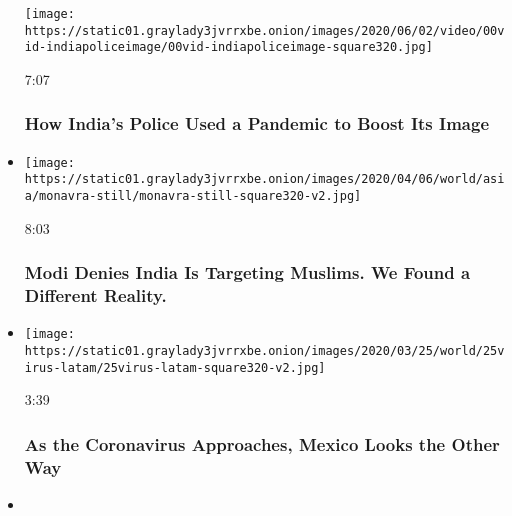 \begin{itemize}
  \texttt{[image: https://static01.graylady3jvrrxbe.onion/images/2020/06/02/video/00vid-indiapoliceimage/00vid-indiapoliceimage-square320.jpg]}

  7:07

  \hypertarget{how-indias-police-used-a-pandemic-to-boost-its-image}{%
  \subsubsection{How India's Police Used a Pandemic to Boost Its
  Image}\label{how-indias-police-used-a-pandemic-to-boost-its-image}}
\item
  \href{https://www.nytimes3xbfgragh.onion/video/world/asia/100000006963057/modi-muslims-india-citizenship-test.html?action=click\&module=video-series-bar\&region=header\&pgtype=Article\&playlistId=video/on-the-ground}{}

  \texttt{[image: https://static01.graylady3jvrrxbe.onion/images/2020/04/06/world/asia/monavra-still/monavra-still-square320-v2.jpg]}

  8:03

  \hypertarget{modi-denies-india-is-targeting-muslims-we-found-a-different-reality}{%
  \subsubsection{Modi Denies India Is Targeting Muslims. We Found a
  Different
  Reality.}\label{modi-denies-india-is-targeting-muslims-we-found-a-different-reality}}
\item
  \href{https://www.nytimes3xbfgragh.onion/video/world/americas/100000007049738/as-coronavirus-approaches-mexico-president-looks-other-way.html?action=click\&module=video-series-bar\&region=header\&pgtype=Article\&playlistId=video/on-the-ground}{}

  \texttt{[image: https://static01.graylady3jvrrxbe.onion/images/2020/03/25/world/25virus-latam/25virus-latam-square320-v2.jpg]}

  3:39

  \hypertarget{as-the-coronavirus-approaches-mexico-looks-the-other-way}{%
  \subsubsection{As the Coronavirus Approaches, Mexico Looks the Other
  Way}\label{as-the-coronavirus-approaches-mexico-looks-the-other-way}}
\item
  \href{https://www.nytimes3xbfgragh.onion/video/world/americas/100000007011912/us-guatemela-asylum.html?action=click\&module=video-series-bar\&region=header\&pgtype=Article\&playlistId=video/on-the-ground}{}


\end{itemize}
